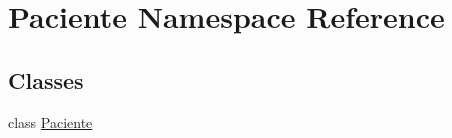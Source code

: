 \hypertarget{namespace_paciente}{}\section{Paciente Namespace Reference}
\label{namespace_paciente}
\subsection*{Classes}
\begin{DoxyCompactItemize}
\item 
class \mbox{\hyperlink{class_paciente_1_1_paciente}{Paciente}}
\end{DoxyCompactItemize}
